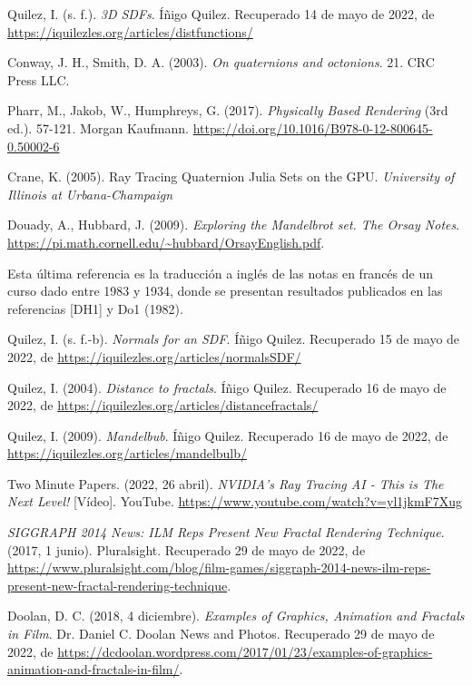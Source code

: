 \begin{thebibliography}{99}
 Quilez, I. (s. f.). \textit{3D SDFs}. Íñigo Quilez. Recuperado 14 de mayo de 2022, de \url{https://iquilezles.org/articles/distfunctions/}

 Conway, J. H., Smith, D. A. (2003). \textit{On quaternions and octonions}. 21. CRC Press LLC.

 Pharr, M., Jakob, W., Humphreys, G. (2017). \textit{Physically Based Rendering} (3rd ed.). 57-121. Morgan Kaufmann. \url{https://doi.org/10.1016/B978-0-12-800645-0.50002-6} 

 Crane, K. (2005). Ray Tracing Quaternion Julia Sets on the GPU. \textit{University of Illinois at Urbana-Champaign}

 Douady, A., Hubbard, J. (2009). \textit{Exploring the Mandelbrot set. The Orsay Notes}. \url{https://pi.math.cornell.edu/~hubbard/OrsayEnglish.pdf}.

Esta última referencia es la traducción a inglés de las notas en francés de un curso dado entre 1983 y 1934, donde se presentan resultados publicados en las referencias [DH1] y Do1 (1982).

 Quilez, I. (s. f.-b). \textit{Normals for an SDF}. Íñigo Quilez. Recuperado 15 de mayo de 2022, de \url{https://iquilezles.org/articles/normalsSDF/}

 Quilez, I. (2004). \textit{Distance to fractals}. Íñigo Quilez. Recuperado 16 de mayo de 2022, de \url{https://iquilezles.org/articles/distancefractals/}

 Quilez, I. (2009). \textit{Mandelbub}. Íñigo Quilez. Recuperado 16 de mayo de 2022, de \url{https://iquilezles.org/articles/mandelbulb/}


 Two Minute Papers. (2022, 26 abril). \textit{NVIDIA’s Ray Tracing AI - This is The Next Level!} [Vídeo]. YouTube. \url{https://www.youtube.com/watch?v=yl1jkmF7Xug}

 \textit{SIGGRAPH 2014 News: ILM Reps Present New Fractal Rendering Technique}. (2017, 1 junio). Pluralsight. Recuperado 29 de mayo de 2022, de \url{https://www.pluralsight.com/blog/film-games/siggraph-2014-news-ilm-reps-present-new-fractal-rendering-technique}.

 Doolan, D. C. (2018, 4 diciembre). \textit{Examples of Graphics, Animation and Fractals in Film}. Dr. Daniel C. Doolan News and Photos. Recuperado 29 de mayo de 2022, de \url{https://dcdoolan.wordpress.com/2017/01/23/examples-of-graphics-animation-and-fractals-in-film/}.

\end{thebibliography}


